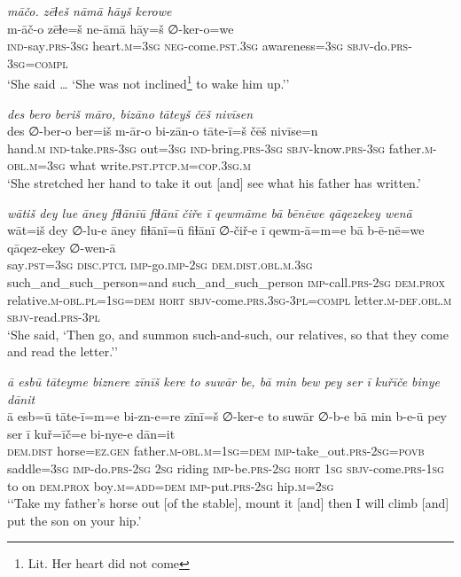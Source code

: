 \ea \label{KŠ.69}
\textit{māčo. zēɫeš nāmā hāyš kerowe} \\ 
\gll m-āč-o zēɫe=š ne-āmā hāy=š ∅-ker-o=we \\ 
 \textsc{ind-}say\textsc{.prs}\textsc{-3sg} heart\textsc{.m}\textsc{=3sg} \textsc{neg-}come\textsc{.pst}\textsc{.3sg} awareness\textsc{=3sg} \textsc{sbjv-}do\textsc{.prs}\textsc{-3sg}\textsc{=compl} \\ 
\glt `She said … ‘She was not inclined\footnote{Lit. Her heart did not come} to wake him up.’'
\z 
 
\ea \label{KŠ.71}
\textit{des bero beriš māro, bizāno tāteyš čēš nivīsen} \\ 
\gll des ∅-ber-o ber=iš m-ār-o bi-zān-o tāte-ī=š čēš nivīse=n \\ 
 hand\textsc{.m} \textsc{ind-}take\textsc{.prs}\textsc{-3sg} out\textsc{=3sg} \textsc{ind-}bring\textsc{.prs}\textsc{-3sg} \textsc{sbjv-}know\textsc{.prs}\textsc{-3sg} father\textsc{.m}\textsc{-obl}\textsc{.m}\textsc{=3sg} what write\textsc{.pst}\textsc{.ptcp}\textsc{.m}\textsc{=cop}\textsc{.3sg}\textsc{.m} \\ 
\glt `She stretched her hand to take it out [and] see what his father has written.'
\z 
 
\ea \label{KŠ.86}
\textit{wātiš dey lue āney fiɫānīū fiɫānī čiře ī qewmāme bā bēnēwe qāqezekey wenā} \\ 
\gll wāt=iš dey ∅-lu-e āney fiɫānī=ū fiɫānī ∅-čiř-e ī qewm-ā=m=e bā b-ē-nē=we qāqez-ekey ∅-wen-ā \\ 
 say\textsc{.pst}\textsc{=3sg} \textsc{disc.ptcl} \textsc{imp-}go.\textsc{imp-}\textsc{2sg} \textsc{dem.dist}\textsc{.obl}\textsc{.m}\textsc{.3sg} such\_and\_such\_person=and such\_and\_such\_person \textsc{imp-}call\textsc{.prs}-\textsc{2sg} \textsc{dem.prox} relative\textsc{.m}\textsc{-obl}\textsc{.pl}\textsc{=\textsc{1sg}}\textsc{=dem} \textsc{hort} \textsc{sbjv-}come\textsc{.prs}\textsc{.3sg}\textsc{-3pl}\textsc{=compl} letter\textsc{.m}\textsc{-def}\textsc{.obl}\textsc{.m} \textsc{sbjv-}read\textsc{.prs}\textsc{-3pl} \\ 
\glt `She said, ‘Then go, and summon such-and-such, our relatives, so that they come and read the letter.’'
\z 
 
\ea \label{KŠ.96}
\textit{ā esbū tāteyme biznere zīnīš kere to suwār be, bā min bew pey ser ī kuřīče binye dānit} \\ 
\gll ā esb=ū tāte-ī=m=e bi-zn-e=re zīnī=š ∅-ker-e to suwār ∅-b-e bā min b-e-ū pey ser ī kuř=īč=e bi-nye-e dān=it \\ 
 \textsc{dem.dist} horse\textsc{\textsc{=ez.gen}} father\textsc{.m}\textsc{-obl}\textsc{.m}\textsc{=\textsc{1sg}}\textsc{=dem} \textsc{imp-}take\_out\textsc{.prs}-\textsc{2sg}\textsc{=\textsc{povb}} saddle\textsc{=3sg} \textsc{imp-}do\textsc{.prs}-\textsc{2sg} \textsc{2sg} riding \textsc{imp-}be\textsc{.prs}-\textsc{2sg} \textsc{hort} \textsc{1sg} \textsc{sbjv-}come\textsc{.prs}\textsc{-\textsc{1sg}} to on \textsc{dem.prox} boy\textsc{.m}\textsc{=add}\textsc{=dem} \textsc{imp-}put\textsc{.prs}-\textsc{2sg} hip\textsc{.m}\textsc{=\textsc{2sg}} \\ 
\glt `‘Take my father’s horse out [of the stable], mount it [and] then I will climb [and] put the son on your hip.'
\z 
 
